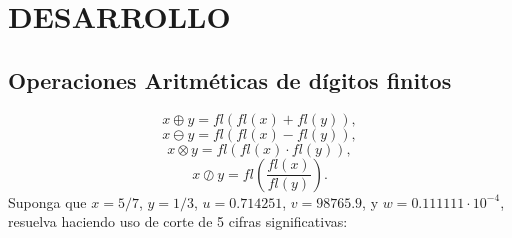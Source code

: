 \documentclass[12pt]{article}
\begin{document}
\vspace{0.5cm}

\section*{DESARROLLO}

\subsection*{Operaciones Aritméticas de dígitos finitos}
\[
x \oplus y = fl(fl(x) + fl(y)),
\]
\[
x \ominus y = fl(fl(x) - fl(y)),
\]
\[
x \otimes y = fl(fl(x) \cdot fl(y)),
\]
\[
x \oslash y = fl\left(\frac{fl(x)}{fl(y)}\right).
\]
Suponga que $x = 5/7$,  $y = 1/3$, $u = 0.714251$, $v = 98765.9$, y $w = 0.111111 \cdot10^{-4}$, resuelva haciendo uso de corte de 5 cifras significativas:
\end{document}
